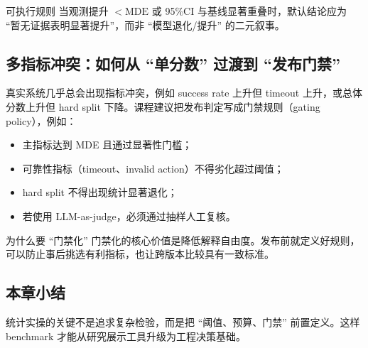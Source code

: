 \begin{importantbox}{可执行规则}
当观测提升 $< \mathrm{MDE}$ 或 95\%CI 与基线显著重叠时，默认结论应为 ``暂无证据表明显著提升''，而非 ``模型退化/提升'' 的二元叙事。
\end{importantbox}

\subsection{多指标冲突：如何从 ``单分数'' 过渡到 ``发布门禁''}
真实系统几乎总会出现指标冲突，例如 success rate 上升但 timeout 上升，或总体分数上升但 hard split 下降。课程建议把发布判定写成门禁规则（gating policy），例如：
\begin{itemize}
    \item 主指标达到 MDE 且通过显著性门槛；
    \item 可靠性指标（timeout、invalid action）不得劣化超过阈值；
    \item hard split 不得出现统计显著退化；
    \item 若使用 LLM-as-judge，必须通过抽样人工复核。
\end{itemize}

\begin{knowledgebox}{为什么要 ``门禁化''}
门禁化的核心价值是降低解释自由度。发布前就定义好规则，可以防止事后挑选有利指标，也让跨版本比较具有一致标准。
\end{knowledgebox}

\subsection{本章小结}
统计实操的关键不是追求复杂检验，而是把 ``阈值、预算、门禁'' 前置定义。这样 benchmark 才能从研究展示工具升级为工程决策基础。


